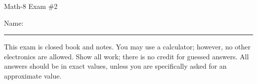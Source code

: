 \documentclass[letterpaper,12pt,fleqn]{article}
\begin{document}
\begin{center}
\Large Math-8 Exam \#2
\end{center}

\vspace{0.5in}

Name: \rule{4in}{1pt}

\vspace{0.5in}

This exam is closed book and notes. You may use a calculator; however, no other
electronics are allowed. Show all work; there is no credit for guessed
answers. All answers should be in exact values, unless you are specifically
asked for an approximate value.

\vspace{0.5in}

\newcommand{\fillin}{\rule[-10pt]{3in}{1pt}}
\newcommand{\sfillin}{\rule[-10pt]{0.5in}{1pt}}
\end{document}
